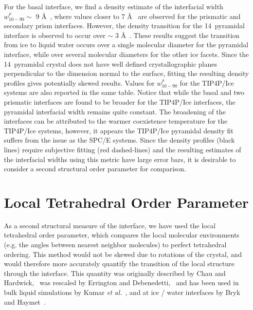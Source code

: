 For the basal interface, we find a density estimate of the interfacial
width $w_\mathrm{10-90}^{\rho} \sim$ 9 \AA~, where values closer to 7
\AA~ are observed for the prismatic and secondary prism
interfaces. However, the density transition for the
14\degree~pyramidal interface is observed to occur over $\sim$ 3
\AA~. These results suggest the transition from ice to liquid water
occurs over a single molecular diameter for the pyramidal interface,
while over several molecular diameters for the other ice facets. Since
the 14\degree~pyramidal crystal does not have well defined
crystallographic planes perpendicular to the dimension normal to the
surface, fitting the resulting density profiles gives potentially
skewed results. Values for $w_\mathrm{10-90}^{\rho}$ for the TIP4P/Ice
systems are also reported in the same table. Notice that while the
basal and two prismatic interfaces are found to be broader for the
TIP4P/Ice interfaces, the pyramidal interfacial width remains quite
constant. The broadening of the interfaces can be attributed to the
warmer coexistence temperature for the TIP4P/Ice systems, however, it
appears the TIP4P/Ice pyramidal density fit suffers from the issue as
the SPC/E systems.  Since the density profiles (black lines) require
subjective fitting (red dashed-lines) and the resulting estimates of
the interfacial widths using this metric have large error bars, it is
desirable to consider a second structural order parameter for
comparison.

\section{Local Tetrahedral Order Parameter}\label{sec:tetra}
As a second structural measure of the interface, we have used the
local tetrahedral order parameter, which compares the local molecular
environments (e.g. the angles between nearest neighbor molecules) to
perfect tetrahedral ordering. This method would not be skewed due to
rotations of the crystal, and would therefore more accurately quantify
the transition of the local structure through the interface. This
quantity was originally described by Chau and
Hardwick,~\cite{Chau1998} was rescaled by Errington and
Debenedetti,~\cite{Errington2001} and has been used in bulk liquid
simulations by Kumar \textit{et al.}~\cite{Kumar2009}, and at ice /
water interfaces by Bryk and Haymet~\cite{Bryk2004}.

